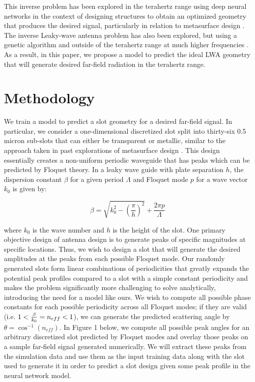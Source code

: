 \documentclass[11pt]{article}
\begin{document}
\noindent This inverse problem has been explored in the terahertz range using deep neural networks in the context of designing structures to obtain an optimized geometry that produces the desired signal, particularly in relation to metasurface design \cite{Deng:21, 9602997}. The inverse Leaky-wave antenna problem has also been explored, but using a genetic algorithm and outside of the terahertz range at much higher frequencies \cite{Jafar-Zanjani:2018vy}. As a result, in this paper, we propose a model to predict the ideal LWA geometry that will generate desired far-field radiation in the terahertz range.

\section*{Methodology}

We train a model to predict a slot geometry for a desired far-field signal. In particular, we consider a one-dimensional discretized slot split into thirty-six 0.5 micron sub-slots that can either be transparent or metallic, similar to the approach taken in past explorations of metasurface design \cite{Jafar-Zanjani:2018vy}. This design essentially creates a non-uniform periodic waveguide that has peaks which can be predicted by Floquet theory. In a leaky wave guide with plate separation $h$, the dispersion constant $\beta$ for a given period $\Lambda$ and Floquet mode $p$ for a wave vector $k_0$ is given by:

\[\beta=\sqrt{k_0^2 - (\frac{\pi}{h})^2} +\frac{2\pi p}{\Lambda} \tag{1} \label{eq:special}\] 

\noindent where $k_0$ is the wave number and $h$ is the height of the slot. One primary objective design of antenna design is to generate peaks of specific magnitudes at specific locations. Thus, we wish to design a slot that will generate the desired amplitudes at the peaks from each possible Floquet mode. Our randomly generated slots form linear combinations of periodicities that greatly expands the potential peak profiles compared to a slot with a simple constant periodicity and makes the problem significantly more challenging to solve analytically, introducing the need for a model like ours. We wish to compute all possible phase constants for each possible periodicity across all Floquet modes; if they are valid (i.e. $\-1 < \frac{\beta}{k_0} = n_{eff} < 1$), we can generate the predicted scattering angle by $\theta = \cos^{-1}(n_{eff})$. In Figure 1 below, we compute all possible peak angles for an arbitrary discretized slot predicted by Floquet modes and overlay those peaks on a sample far-field signal generated numerically. We will extract these peaks from the simulation data and use them as the input training data along with the slot used to generate it in order to predict a slot design given some peak profile in the neural network model.
\end{document}
